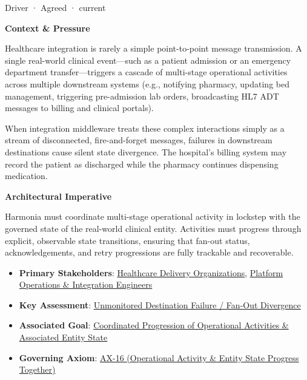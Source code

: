 \label{element:b3fb294d95024e4382b2c251c389fa66}
{\small Driver · Agreed · current}\par

\par\medskip\textbf{Context \& Pressure}\par


Healthcare integration is rarely a simple point-to-point message transmission. A single real-world clinical event—such as a patient admission or an emergency department transfer—triggers a cascade of multi-stage operational activities across multiple downstream systems (e.g., notifying pharmacy, updating bed management, triggering pre-admission lab orders, broadcasting HL7 ADT messages to billing and clinical portals).



When integration middleware treats these complex interactions simply as a stream of disconnected, fire-and-forget messages, failures in downstream destinations cause silent state divergence. The hospital's billing system may record the patient as discharged while the pharmacy continues dispensing medication.



\par\medskip\textbf{Architectural Imperative}\par


Harmonia must coordinate multi-stage operational activity in lockstep with the governed state of the real-world clinical entity. Activities must progress through explicit, observable state transitions, ensuring that fan-out status, acknowledgements, and retry progressions are fully trackable and recoverable.



\begin{itemize}


\item \textbf{Primary Stakeholders}: \href{\detokenize{../../../../../../../../../docs/markdown/01-motivation/stakeholders/enterprise-stakeholders.md}}{Healthcare Delivery Organizations}, \href{\detokenize{../../../../../../../../../docs/markdown/01-motivation/stakeholders/enterprise-stakeholders.md}}{Platform Operations \& Integration Engineers}

\item \textbf{Key Assessment}: \href{\detokenize{../../../../../../../../../docs/markdown/01-motivation/drivers-assessments/assessments.md}}{Unmonitored Destination Failure / Fan-Out Divergence}

\item \textbf{Associated Goal}: \href{\detokenize{../../../../../../../../../docs/markdown/01-motivation/goals-outcomes/strategic-goals.md}}{Coordinated Progression of Operational Activities \& Associated Entity State}

\item \textbf{Governing Axiom}: \hyperref[element:de7e90f46127455a9ec9ad3b9b48ba54]{AX-16 (Operational Activity \& Entity State Progress Together)}

\end{itemize}

